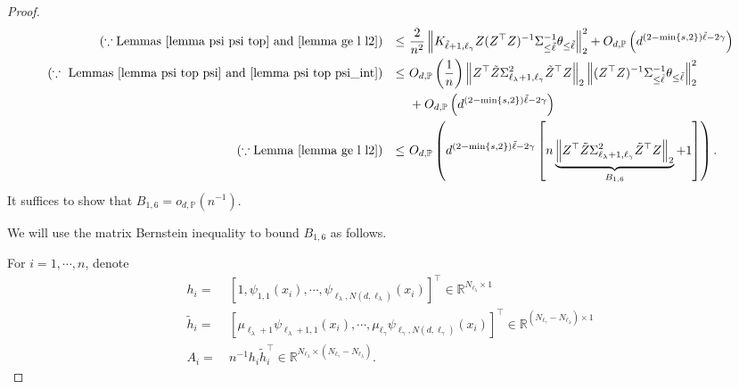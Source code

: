 \documentclass{article}
\theoremstyle{plain}
\theoremstyle{definition}
\theoremstyle{remark}
\newcommand{\green}{\color{green}}
\newcommand{\dhnote}[1]{{\color{red}[#1]} } %
\begin{document}
\begin{appendix}
\begin{proof}
\begin{equation*}
\begin{aligned}
                (\because \text{Lemmas } \ref{lemma psi psi top} \text{ and } \ref{lemma ge l l2})\quad {\leq}&~
                \frac{2}{n^2}\left\| K_{\tilde{\ell}+1, \ell_{\gamma}} 
                Z (Z^{\top} 
                Z)^{-1}\Sigma_{\leq \tilde{\ell}}^{-1} \theta_{\leq \tilde{\ell}} \right\|_{2}^{2}
                + O_{d, \mathbb{P}}\left( d^{(2-\min\{s, 2\})\tilde{\ell}-2\gamma }\right)\\
                (\because\text{ Lemmas } \ref{lemma psi top psi} \text{ and } \ref{lemma psi top psi_int}) \quad   {\leq}&~
                O_{d, \mathbb{P}}\left( \frac{1}{n}\right)
                \left\| Z^{\top} \tilde{Z} \Sigma_{\ell_{\lambda}+1, \ell_{\gamma}}^2 \tilde{Z}^{\top} Z  \right\|_{2}
                \left\| (Z^{\top} 
                Z)^{-1}\Sigma_{\leq \tilde{\ell}}^{-1} \theta_{\leq \tilde{\ell}} \right\|_{2}^{2}
                \\   &~
                + O_{d, \mathbb{P}}\left( d^{(2-\min\{s, 2\})\tilde{\ell}-2\gamma }\right)\\
                (\because\text{Lemma } \ref{lemma ge l l2}) \quad  {\leq}&~
                O_{d, \mathbb{P}}\left( d^{(2-\min\{s, 2\})\tilde{\ell}-2\gamma } \left[ n\underbrace{\left\| Z^{\top} \tilde{Z} \Sigma_{\ell_{\lambda}+1, \ell_{\gamma}}^2 \tilde{Z}^{\top} Z  \right\|_{2}}_{B_{1,6}}+1 \right]\right).
\end{aligned}
\end{equation*}
It suffices to show that $B_{1, 6}=o_{d,\mathbb{P}}(n^{-1})$. 

We will use the matrix Bernstein inequality to bound $B_{1, 6}$ as follows. 



For $i=1,\cdots, n$, denote
\begin{align*}
    h_i =&~ \left[1, \psi_{1,1}(x_i), \cdots, \psi_{\ell_\lambda, N(d, \ell_\lambda)}(x_i) \right]^{\top} \in \mathbb{R}^{N_{\ell_\lambda} \times 1}\\
    \tilde{h}_i =&~ \left[\mu_{\ell_\lambda+1}\psi_{\ell_\lambda+1,1}(x_i), \cdots, \mu_{\ell_{\gamma}}\psi_{\ell_{\gamma}, N(d, \ell_{\gamma})}(x_i) \right]^{\top} \in \mathbb{R}^{(N_{\ell_{\gamma}}-N_{\ell_\lambda}) \times 1}\\
    A_i =&~ n^{-1} h_i \tilde{h}_i^{\top} \in \mathbb{R}^{N_{\ell_\lambda} \times (N_{\ell_{\gamma}}-N_{\ell_\lambda})}.
\end{align*}


\end{proof}
\end{appendix}
\end{document}
